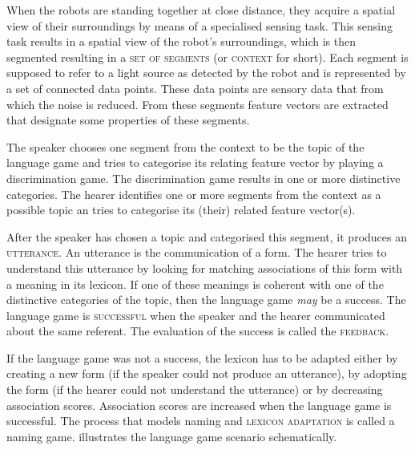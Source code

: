 When the robots are standing together at close distance, they acquire a spatial view of their surroundings by means of a specialised sensing task. This sensing task results in a spatial view of the robot's surroundings, which is then segmented resulting in a {\scshape set of segments} (or {\scshape context} for short). Each segment is supposed to refer to a light source as detected by the robot and is represented by a set of connected data points. These data points are sensory data that from which the noise is reduced. From these segments feature vectors are extracted that designate some properties of these segments. 

The speaker chooses one segment from the context to be the topic of the language game and tries to categorise its relating feature vector by playing a discrimination game. The discrimination game results in one or more distinctive categories. The hearer identifies one or more segments from the context as a possible topic an tries to categorise its (their) related feature vector(s).

After the speaker has chosen a topic and categorised this segment, it produces an {\scshape utterance}. An utterance is the communication of a form. The hearer tries to understand this utterance by looking for matching associations of this form with a meaning in its lexicon. If one of these meanings is coherent with one of the distinctive categories of the topic, then the language game {\it may} be a success. The language game is {\scshape successful} when the speaker and the hearer communicated about the same referent. The evaluation of the success is called the {\scshape feedback}.

If the language game was not a success, the lexicon has to be adapted either by creating a new form (if the speaker could not produce an utterance), by adopting the form (if the hearer could not understand the utterance) or by decreasing association scores. Association scores are increased when the language game is successful. The process that models naming and {\scshape lexicon adaptation} is called a naming game.  illustrates the language game scenario schematically.

